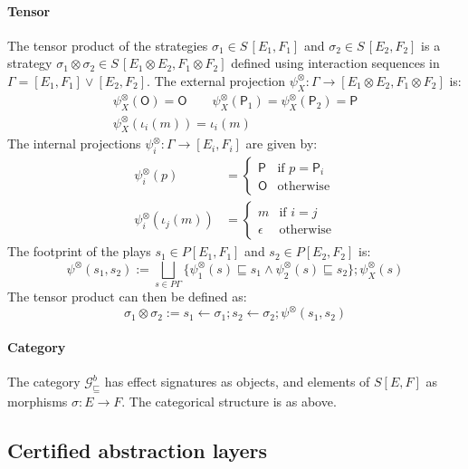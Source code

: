 \documentclass[sigplan,10pt,review,anonymous]{acmart}
\newcommand{\gcat}{\mathcal{G}_{\sqsubseteq}}
\newcommand{\kw}[1]{\ensuremath{ \mathsf{#1} }}
\begin{document}

\paragraph{Tensor} %

The tensor product of the strategies
$\sigma_1 \in S\,[E_1,F_1]$ and 
$\sigma_2 \in S\,[E_2,F_2]$
is a strategy
$\sigma_1 \otimes \sigma_2 \in S\,[E_1 \otimes E_2, F_1 \otimes F_2]$
defined using interaction sequences in
$\Gamma = [E_1,F_1] \vee [E_2,F_2]$.
The external projection
$\psi^\otimes_X : \Gamma \rightarrow [E_1 \otimes E_2, F_1 \otimes F_2]$
is:
\begin{gather*}
  \psi^\otimes_X(\kw{O}) = \kw{O} \qquad
  \psi^\otimes_X(\kw{P}_1) = \psi^\otimes_X(\kw{P}_2) = \kw{P} \\
  \psi^\otimes_X(\iota_i(m)) = \iota_i(m)
\end{gather*}
The internal projections
$\psi^\otimes_i : \Gamma \rightarrow [E_i, F_i]$
are given by:
\begin{align*}
  \psi^\otimes_i(p) &= \begin{cases}
    \kw{P} & \text{if } p = \kw{P}_i \\
    \kw{O} & \text{otherwise}
  \end{cases} \\
  \psi^\otimes_i(\iota_j(m)) &= \begin{cases}
    m & \text{if } i = j \\
    \epsilon & \text{otherwise}
  \end{cases}
\end{align*}
The footprint of the plays
$s_1 \in P [E_1,F_1]$ and $s_2 \in P [E_2, F_2]$
is:
\[
  \psi^\otimes(s_1, s_2) :=
  \bigsqcup_{s \in P \Gamma}
  \{ \psi^\otimes_1(s) \sqsubseteq s_1 \wedge
     \psi^\otimes_2(s) \sqsubseteq s_2 \} ;
  \psi^\otimes_X(s)
\]
The tensor product can then be defined as:
\[
  \sigma_1 \otimes \sigma_2 :=
  s_1 \leftarrow \sigma_1 ;
  s_2 \leftarrow \sigma_2 ;
  \psi^\otimes(s_1, s_2)
\]


\paragraph{Category}

The category $\gcat^b$
has effect signatures as objects,
and elements of $S [E,F]$
as morphisms $\sigma : E \rightarrow F$.
The categorical structure is as above.

\subsection{Certified abstraction layers}
\end{document}
